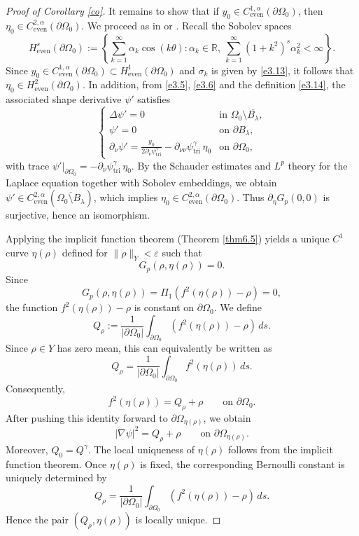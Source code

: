 \documentclass[reqno]{amsart}
\numberwithin{equation}{section}
\numberwithin{equation}{section}
\numberwithin{equation}{section}
\begin{document}
\begin{proof}[Proof of Corollary \ref{co}]
It remains to show that if \(y_0 \in C^{1,\alpha}_\mathrm{even}(\partial \Omega_0)\), then \(\eta_0 \in C^{2,\alpha}_\mathrm{even}(\partial \Omega_0)\). We proceed as in \cite[Proposition 5.2]{KamburovS} or \cite[Proof of Theorem II]{Cavallina}. Recall the Sobolev spaces
\[
H^s_\mathrm{even}(\partial \Omega_0) := \left\{ \sum_{k=1}^\infty \alpha_k \cos(k\theta) : \alpha_k \in \mathbb{R},\ \sum_{k=1}^\infty (1 + k^2)^s \alpha_k^2 < \infty \right\}.
\]
Since \(y_0 \in C^{1,\alpha}_\mathrm{even}(\partial \Omega_0) \subset H^1_\mathrm{even}(\partial \Omega_0)\) and \(\sigma_k\) is given by \eqref{e3.13}, it follows that \(\eta_0 \in H^2_\mathrm{even}(\partial \Omega_0)\). In addition, from \eqref{e3.5}, \eqref{e3.6} and the definition \eqref{e3.14}, the associated shape derivative \(\psi'\) satisfies
\begin{equation}
\begin{cases}
\Delta \psi' = 0 & \text{in } \Omega_0 \setminus \overline{B_\lambda}, \\
\psi' = 0 & \text{on } \partial B_\lambda, \\
\partial_\nu \psi' = \frac{y_0}{2\partial_\nu \psi^\gamma_\mathrm{tri}} - \partial_{\nu\nu} \psi^\gamma_\mathrm{tri} \, \eta_0 & \text{on } \partial \Omega_0,  \nonumber
\end{cases}
\end{equation}
with trace \(\psi'|_{\partial \Omega_0} = -\partial_\nu \psi^\gamma_\mathrm{tri} \, \eta_0\). By the Schauder estimates and \(L^p\) theory for the Laplace equation together with Sobolev embeddings, we obtain \(\psi' \in C^{2,\alpha}_\mathrm{even}(\overline{\Omega_0 \setminus B_\lambda})\), which implies \(\eta_0 \in C^{2,\alpha}_\mathrm{even}(\partial \Omega_0)\). Thus \(\partial_\eta G_p(0,0)\) is surjective, hence an isomorphism.


Applying the implicit function theorem (Theorem \ref{thm6.5}) yields a unique \(C^1\) curve \(\eta(\rho)\) defined for \(\|\rho\|_Y < \varepsilon\) such that
\begin{equation}\label{e3.15}
G_p(\rho, \eta(\rho)) = 0.
\end{equation}
Since
\[ G_p(\rho,\eta(\rho)) = \Pi_1\left(f^2(\eta(\rho))-\rho\right) =0, \]
the function \(f^2(\eta(\rho))-\rho\) is constant on \(\partial\Omega_0\).
We define
\[ Q_\rho := \frac{1}{|\partial\Omega_0|} \int_{\partial\Omega_0} \left(f^2(\eta(\rho))-\rho\right)\,ds. \]
Since \(\rho\in Y\) has zero mean, this can equivalently be written as
\[ Q_\rho = \frac{1}{|\partial\Omega_0|} \int_{\partial\Omega_0} f^2(\eta(\rho))\,ds. \]
Consequently,
\[ f^2(\eta(\rho)) = Q_\rho+\rho \qquad\text{on }\partial\Omega_0. \]
After pushing this identity forward to \(\partial\Omega_{\eta(\rho)}\),
we obtain
\[ |\nabla\psi|^2 = Q_\rho+\rho \qquad\text{on }\partial\Omega_{\eta(\rho)}. \]
Moreover, \(Q_0=Q^\gamma\).
The local uniqueness of \(\eta(\rho)\) follows from the implicit function theorem. Once \(\eta(\rho)\) is fixed, the corresponding Bernoulli constant is uniquely determined by
\[ Q_\rho = \frac{1}{|\partial\Omega_0|} \int_{\partial\Omega_0} \left(f^2(\eta(\rho))-\rho\right)\,ds. \]
Hence the pair \((Q_\rho,\eta(\rho))\) is locally unique.


\end{proof}
\end{document}
